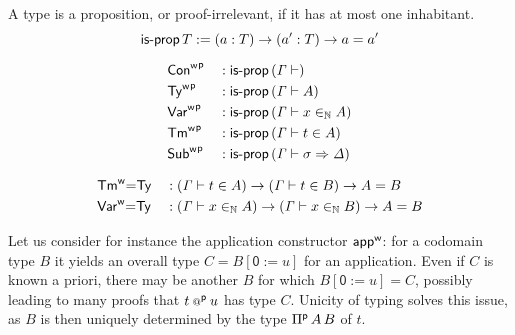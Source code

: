\begin{definition}[Proposition]
  A type is a proposition, or proof-irrelevant, if it has at most one inhabitant.
  \[
    \mathsf{is\text{-}prop}\,T := (a : T) \rightarrow (a' : T) \rightarrow a = a'
  \]
\end{definition}

\begin{lemma}\label{lem:uniq-typing-types}
\begin{alignat*}{5}
 & {{\mathsf{Con}}^{\mathsf{w}}}^{\mathsf{p}} && : \mathsf{is\text{-}prop}\, (\mathit{\Gamma}\vdash) \\
 & {{\mathsf{Ty}}^{\mathsf{w}}}^{\mathsf{p}} && : \mathsf{is\text{-}prop}\, (\mathit{\Gamma}\vdash A) \\
 & {{\mathsf{Var}}^{\mathsf{w}}}^{\mathsf{p}} && : \mathsf{is\text{-}prop}\, (\mathit{\Gamma}\vdash x \in_{\mathbb{N}} A) \\
 & {{\mathsf{Tm}}^{\mathsf{w}}}^{\mathsf{p}} && : \mathsf{is\text{-}prop}\, (\mathit{\Gamma}\vdash t \in A) \\
 & {{\mathsf{Sub}}^{\mathsf{w}}}^{\mathsf{p}} && : \mathsf{is\text{-}prop}\, (\mathit{\Gamma}\vdash \sigma \Rightarrow \mathit{\Delta})
\end{alignat*}
\end{lemma}

\begin{lemma}
\begin{alignat*}{5}
  &
  {\mathsf{Tm}}^{\mathsf{w}}{=}\mathsf{Ty} & &:
  (\mathit{\Gamma} \vdash t \in A) \rightarrow
  (\mathit{\Gamma} \vdash t \in B) \rightarrow A = B
  \\
  &
  {\mathsf{Var}}^{\mathsf{w}}{=}\mathsf{Ty} & &:
  (\mathit{\Gamma} \vdash x \in_{\mathbb{N}} A) \rightarrow
  (\mathit{\Gamma} \vdash x \in_{\mathbb{N}} B) \rightarrow A = B
\end{alignat*}
\end{lemma}
Let us consider for instance the application constructor ${\mathsf{app}}^{\mathsf{w}}$: for a codomain
type $B$ it yields an overall type $C=B[\mathsf{0} := u]$ for an application. Even
if $C$ is known a priori, there may be another $B$ for which $B[\mathsf{0} := u] = C$,
possibly leading to many proofs that $t\mathbin{{{\scriptstyle @}}^{\mathsf{p}}} u$ has type $C$. Unicity of typing
solves this issue, as $B$ is then uniquely determined by the type ${\Pi}^{\mathsf{p}}\,A\,B$
of $t$.




